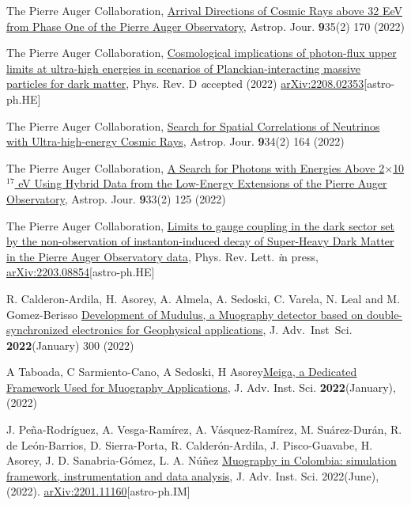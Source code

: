 \begin{etaremune}
\item {} The Pierre Auger Collaboration, \href{https://doi.org/10.3847/1538-4357/ac7d4e}{Arrival Directions of Cosmic Rays above 32 EeV from Phase One of the Pierre Auger Observatory}, Astrop. Jour. {\textbf 935}(2) 170 (2022)

\item {} The Pierre Auger Collaboration, \href{}{Cosmological implications of photon-flux upper limits at ultra-high energies in scenarios of Planckian-interacting massive particles for dark matter}, Phys. Rev. D {\textit accepted} (2022) \href{https://arxiv.org/abs/2208.02353}{arXiv:2208.02353}[astro-ph.HE]

\item {} The Pierre Auger Collaboration, \href{https://doi.org/10.3847/1538-4357/ac6def}{Search for Spatial Correlations of Neutrinos with Ultra-high-energy Cosmic Rays}, Astrop. Jour. {\textbf 934}(2) 164 (2022)

\item {} The Pierre Auger Collaboration, \href{https://doi.org/10.3847/1538-4357/ac7393}{A Search for Photons with Energies Above 2$\times$10$^{17}$ eV Using Hybrid Data from the Low-Energy Extensions of the Pierre Auger Observatory}, Astrop. Jour. {\textbf 933}(2) 125 (2022)

\item {} The Pierre Auger Collaboration, \href{}{Limits to gauge coupling in the dark sector set by the non-observation of instanton-induced decay of Super-Heavy Dark Matter in the Pierre Auger Observatory data}, Phys. Rev. Lett. {\textit in press}, \href{https://arxiv.org/abs/2203.08854}{arXiv:2203.08854}[astro-ph.HE]

\item {} R. Calderon-Ardila, H. Asorey, A. Almela, A. Sedoski, C. Varela, N. Leal and M. Gomez-Berisso \href{http://doi.org/10.31526/jais.2022.300}{Development of Mudulus, a Muography detector based on double-synchronized electronics for Geophysical applications}, J. Adv.\ Inst\  Sci. {\textbf{2022}}(January) 300 (2022)

\item {} A Taboada, C Sarmiento-Cano, A Sedoski, H Asorey\href{https://doi.org/10.31526/jais.2022.266}{Meiga, a Dedicated Framework Used for Muography Applications},  J. Adv. Inst. Sci. {\textbf{2022}}(January), (2022) %

\item {} J. Peña-Rodríguez, A. Vesga-Ramírez, A. Vásquez-Ramírez, M. Suárez-Durán, R. de León-Barrios, D. Sierra-Porta, R. Calderón-Ardila, J. Pisco-Guavabe, H. Asorey, J. D. Sanabria-Gómez, L. A. Núñez \href{https://doi.org/10.31526/jais.2022.271}{Muography in Colombia: simulation framework, instrumentation and data analysis}, J. Adv. Inst. Sci. 2022(June), (2022). \href{ http://arxiv.org/abs/2201.11160}{arXiv:2201.11160}[astro-ph.IM]


\end{etaremune}
